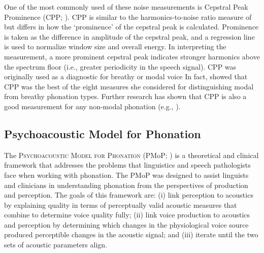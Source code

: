 \documentclass[12pt, letterpaper]{article}
\begin{document}
One of the most commonly used of these noise measurements is Cepstral Peak Prominence (CPP; \cite{hillenbrandAcousticCorrelatesBreathy1994,hillenbrandAcousticCorrelatesBreathy1996}). CPP is similar to the harmonics-to-noise ratio measure of \citet{dekromCepstrumBasedTechniqueDetermining1993} but differs in how the ‘prominence’ of the cepstral peak is calculated. Prominence is taken as the difference in amplitude of the cepstral peak, and a regression line is used to normalize window size and overall energy. In interpreting the measurement, a more prominent cepstral peak indicates stronger harmonics above the spectrum floor (i.e., greater periodicity in the speech signal). CPP was originally used as a diagnostic for breathy or modal voice \citep{blankenshipTimingNonmodalPhonation2002,espositoVariationContrastivePhonation2010} In fact, \citeauthor{espositoEffectsLinguisticExperience2010} showed that CPP was the best of the eight measures she considered for distinguishing modal from breathy phonation types. Further research has shown that CPP is also a good measurement for any non-modal phonation (e.g., \cite{andruskiPhonationTypesProduction2000,andruskiToneClarityMixed2006,blankenshipTimingNonmodalPhonation2002,waylandAcousticCorrelatesBreathy2003,avelinoAcousticElectroglottographicAnalyses2010}). 

\subsection{Psychoacoustic Model for Phonation} \label{sec:PMoP}

The \textsc{Psychoacoustic Model for Phonation} (PMoP; \cite{kreimanUnifiedTheoryVoice2014}) is a theoretical and clinical framework that addresses the problems that linguistics and speech pathologists face when working with phonation. The PMoP was designed to assist linguists and clinicians in understanding phonation from the perspectives of production and perception. The goals of this framework are: (i) link perception to acoustics by explaining quality in terms of perceptually valid acoustic measures that combine to determine voice quality fully; (ii) link voice production to acoustics and perception by determining which changes in the physiological voice source produced perceptible changes in the acoustic signal; and (iii) iterate until the two sets of acoustic parameters align. \citeauthor{kreimanUnifiedTheoryVoice2014} 
\end{document}
